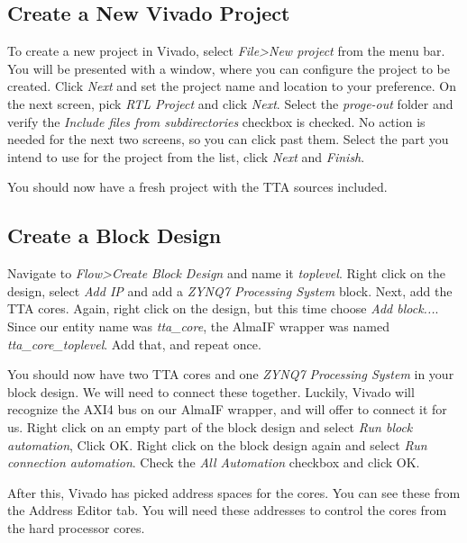 \documentclass[twoside]{tceusermanual}
\begin{document}


\subsection{Create a New Vivado Project}

To create a new project in Vivado, select \textit{File>New project} from the
menu bar. You will be presented with a window, where you can configure the
project to be created. Click \textit{Next} and set the project name and location
to your preference. On the next screen, pick \textit{RTL Project} and click
\textit{Next}. Select the \textit{proge-out} folder and verify the
\textit{Include files from subdirectories} checkbox is checked. No action is
needed for the next two screens, so you can click past them. Select the part
you intend to use for the project from the list, click \textit{Next} and
\textit{Finish}.

You should now have a fresh project with the TTA sources included.

\subsection{Create a Block Design}

Navigate to \textit{Flow>Create Block Design} and name it \textit{toplevel}.
Right click on the design, select \textit{Add IP} and add a \textit{ZYNQ7
Processing System} block. Next, add the TTA cores. Again, right click on the
design, but this time choose \textit{Add block...}. Since our entity name
was \textit{tta\_core}, the AlmaIF wrapper was named
\textit{tta\_core\_toplevel}. Add that, and repeat once.

You should now have two TTA cores and one \textit{ZYNQ7 Processing System} in
your block design. We will need to connect these together. Luckily, Vivado
will recognize the AXI4 bus on our AlmaIF wrapper, and will offer to connect
it for us. Right click on an empty part of the block design and select
\textit{Run block automation}, Click OK. Right click on the block design again
and select \textit{Run connection automation}. Check  the
\textit{All Automation} checkbox and click OK.

After this, Vivado has picked address spaces for the cores. You can see these
from the Address Editor tab. You will need these addresses to control the cores
from the hard processor cores.
\end{document}
